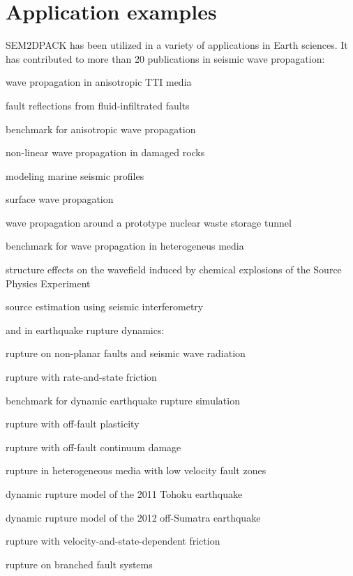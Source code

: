 \section{Application examples}
\label{sec:appli}

SEM2DPACK has been utilized in a variety of applications in Earth sciences.
It has contributed to more than 20 publications in seismic wave propagation:

\begin{sitemize}
  \item wave propagation in anisotropic TTI media 
  \item fault reflections from fluid-infiltrated faults 
  \item benchmark for anisotropic wave propagation 
  \item non-linear wave propagation in damaged rocks  
  \item modeling marine seismic profiles 
  \item surface wave propagation  
  \item wave propagation around a prototype nuclear waste storage tunnel  
  \item benchmark for wave propagation in heterogeneus media 
  \item structure effects on the wavefield induced by chemical explosions of the Source Physics Experiment 
  \item source estimation using seismic interferometry 
\end{sitemize}
and in earthquake rupture dynamics:
\begin{sitemize}
  \item rupture on non-planar faults and seismic wave radiation  
  \item rupture with rate-and-state friction  
  \item benchmark for dynamic earthquake rupture simulation  
  \item rupture with off-fault plasticity  
  \item rupture with off-fault continuum damage  
  \item rupture in heterogeneous media with low velocity fault zones  
  \item dynamic rupture model of the 2011 Tohoku earthquake  
  \item dynamic rupture model of the 2012 off-Sumatra earthquake  
  \item rupture with velocity-and-state-dependent friction  
  \item rupture on branched fault systems  
\end{sitemize}

